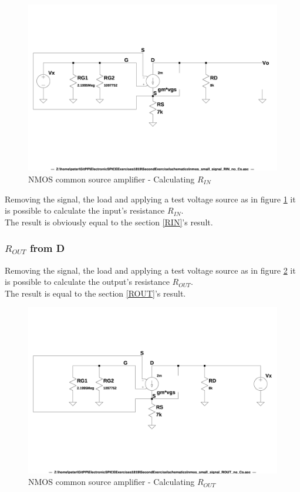 \documentclass[10pt,a4paper]{book}
\begin{document}
\begin{figure}[h]
  \centering
  \includegraphics[width=12cm]{schematics/nmos_small_signal_RIN_no_Cs.jpg}
  \caption{NMOS common source amplifier - Calculating $R_{IN}$}
  \label{nmos_pi_RIN_no_Cs}
\end{figure}

Removing the signal, the load and applying a test voltage source as in figure \ref{nmos_pi_RIN_no_Cs} it is possible to calculate the input's resistance $R_{IN}$.\\
The result is obviously equal to the section \ref{RIN}'s result.\par

\subsubsection{$R_{OUT}$ from D}

Removing the signal, the load and applying a test voltage source as in figure \ref{nmos_pi_ROUT_no_Cs} it is possible to calculate the output's resistance $R_{OUT}$.\\
The result is equal to the section \ref{ROUT}'s result.\par

\begin{figure}[h]
  \centering
  \includegraphics[width=12cm]{schematics/nmos_small_signal_ROUT_no_Cs.jpg}
  \caption{NMOS common source amplifier - Calculating $R_{OUT}$}
  \label{nmos_pi_ROUT_no_Cs}
\end{figure}
\end{document}
